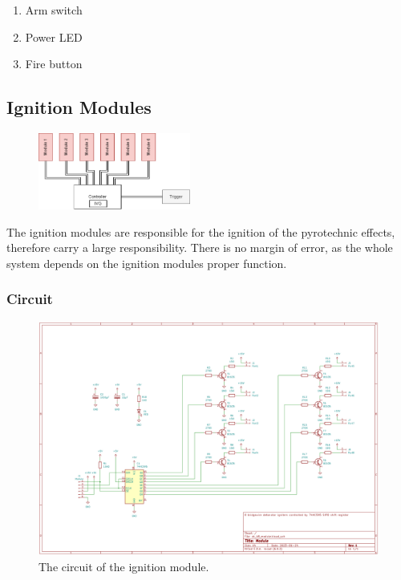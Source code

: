 \begin{enumerate}
	\item Arm switch
	\item Power LED
	\item Fire button
\end{enumerate}

\pagebreak

\subsection{Ignition Modules}
\label{Ignition Modules}

\begin{figure}[!ht]
    \centering
    \includegraphics[width=5cm]{./Figures/concept_modules.png} 
\end{figure}

\noindent The ignition modules are responsible for the ignition of the pyrotechnic effects, therefore carry a large responsibility. There is no margin of error, as the whole system depends on the ignition modules proper function. 

\subsubsection{Circuit}

\begin{figure}[!ht]
    \centering
    \includegraphics[width=15cm]{./Figures/module_circuit.png}
    \caption{The circuit of the ignition module.}
    \label{fig:module_circuit}     
\end{figure}

